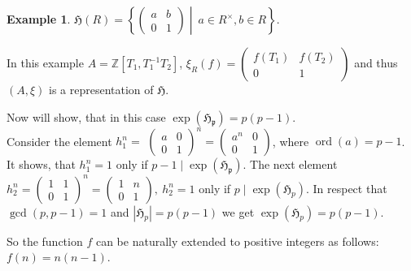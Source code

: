 \documentclass{article}
\theoremstyle{definition}
\newtheorem{example}{Example}
\theoremstyle{definition}
\begin{document}
\begin{example}
    $\mathfrak{H}(R) = \left\{ \left(\begin{matrix}
    a & b\\
    0 & 1
    \end{matrix}\right)\middle|\ a \in R^{\times}, b \in R\right\}$.

    In this example $A = \mathbb{Z}[T_1, T_1^{-1} T_2]$, $\xi_R(f) = \begin{pmatrix}
    f(T_1) & f(T_2)\\
    0 & 1
    \end{pmatrix}$ and thus $(A, \xi)$ is a representation of $\mathfrak{H}$.

Now will show, that in this case $\operatorname{exp}(\mathfrak{H_p}) = p(p - 1).$\\


Consider the element $h_1^n=$
$\left(\begin{matrix}
    a & 0\\
    0 & 1
    \end{matrix}\right)^{n} = \left(\begin{matrix}
    a^n & 0\\
    0 & 1
    \end{matrix}\right)$, where $\operatorname{ord}(a) = p-1$. It shows, that $h_1^n = 1$ only if 
    $p-1 \mid \operatorname{exp}(\mathfrak{H_p})$.
    The next element $h_2^n = \left(\begin{matrix}
    1 & 1\\
    0 & 1
    \end{matrix}\right)^{n} = \left(\begin{matrix}
    1 & n\\
    0 & 1
    \end{matrix}\right),\ h_2^n = 1$ only if $p \mid \operatorname{exp}(\mathfrak{H}_p).$ In respect that 
    $\operatorname{gcd}(p, p-1)=1$ and $\left|\mathfrak{H}_p\right| = p(p - 1)$ we get $\operatorname{exp}(\mathfrak{H}_p)=p(p-1).$

So the function $f$ can be naturally extended to positive integers as follows: $f(n) = n(n - 1)$.

\end{example}
\end{document}
